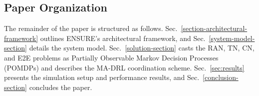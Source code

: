 \documentclass[12pt,lettersize,journal,onecolumn]{IEEEtran}
\begin{document}
\begin{itemize}[leftmargin=1.1em,labelsep=0.3em]
\end{itemize}
\subsection{Paper Organization}
The remainder of the paper is structured as follows. Sec.~\ref{section-architectural-framework} outlines ENSURE's architectural framework, and Sec.~\ref{system-model-section} details the system model. Sec.~\ref{solution-section} casts the RAN, TN, CN, and E2E problems as Partially Observable Markov Decision Processes (POMDPs) and describes the MA-DRL coordination scheme. Sec.~\ref{sec:results} presents the simulation setup and performance results, and Sec.~\ref{conclusion-section} concludes the paper.
\end{document}
